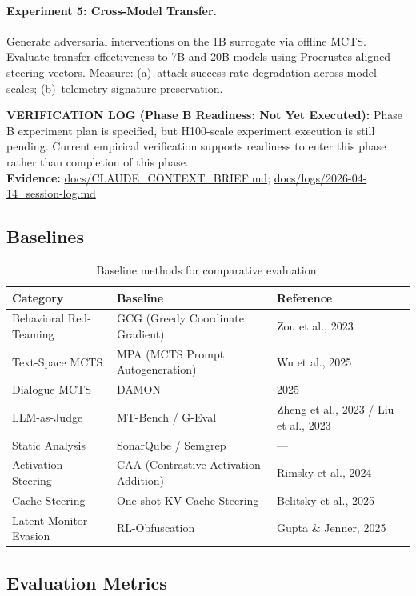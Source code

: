 \documentclass[10pt]{article}
\newcommand{\verifybox}[3]{%
\vspace{0.6em}
\noindent\colorbox{yellow!20}{%
\parbox{\dimexpr\linewidth-2\fboxsep\relax}{%
\textbf{VERIFICATION LOG (#1):} #2\\
\textbf{Evidence:} #3
}}%
\vspace{0.6em}
}
\begin{document}
\paragraph{Experiment 5: Cross-Model Transfer.}
Generate adversarial interventions on the 1B surrogate via offline MCTS. Evaluate transfer effectiveness to 7B and 20B models using Procrustes-aligned steering vectors. Measure: (a)~attack success rate degradation across model scales; (b)~telemetry signature preservation.

\verifybox
{Phase B Readiness: Not Yet Executed}
{Phase B experiment plan is specified, but H100-scale experiment execution is still pending. Current empirical verification supports readiness to enter this phase rather than completion of this phase.}
{\url{docs/CLAUDE_CONTEXT_BRIEF.md}; \url{docs/logs/2026-04-14_session-log.md}}

\subsection{Baselines}

\begin{table}[h]
\centering
\begin{tabular}{@{}lll@{}}
\toprule
\textbf{Category} & \textbf{Baseline} & \textbf{Reference} \\
\midrule
Behavioral Red-Teaming & GCG (Greedy Coordinate Gradient) & Zou et al., 2023 \\
Text-Space MCTS & MPA (MCTS Prompt Autogeneration) & Wu et al., 2025 \\
Dialogue MCTS & DAMON & 2025 \\
LLM-as-Judge & MT-Bench / G-Eval & Zheng et al., 2023 / Liu et al., 2023 \\
Static Analysis & SonarQube / Semgrep & --- \\
Activation Steering & CAA (Contrastive Activation Addition) & Rimsky et al., 2024 \\
Cache Steering & One-shot KV-Cache Steering & Belitsky et al., 2025 \\
Latent Monitor Evasion & RL-Obfuscation & Gupta \& Jenner, 2025 \\
\bottomrule
\end{tabular}
\caption{Baseline methods for comparative evaluation.}
\label{tab:baselines}
\end{table}

\subsection{Evaluation Metrics}
\end{document}
